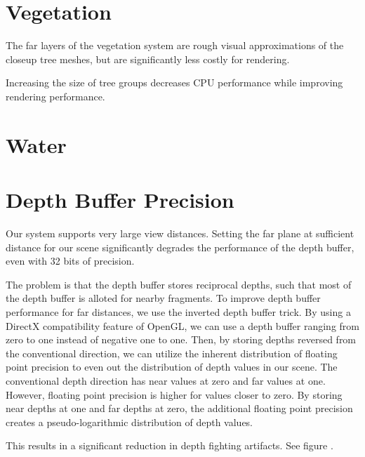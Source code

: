 \section{Vegetation}

The far layers of the vegetation system are rough visual approximations of the closeup tree meshes, but are significantly less costly for rendering.

Increasing the size of tree groups decreases CPU performance while improving rendering performance.


\section{Water}


\section{Depth Buffer Precision}

Our system supports very large view distances.
Setting the far plane at sufficient distance for our scene significantly degrades the performance of the depth buffer, even with 32 bits of precision.

The problem is that the depth buffer stores reciprocal depths, such that most of the depth buffer is alloted for nearby fragments.
To improve depth buffer performance for far distances, we use the inverted depth buffer trick.
By using a DirectX compatibility feature of OpenGL, we can use a depth buffer ranging from zero to one instead of negative one to one.
Then, by storing depths reversed from the conventional direction, we can utilize the inherent distribution of floating point precision to even out the distribution of depth values in our scene.
The conventional depth direction has near values at zero and far values at one.
However, floating point precision is higher for values closer to zero.
By storing near depths at one and far depths at zero, the additional floating point precision creates a pseudo-logarithmic distribution of depth values.

This results in a significant reduction in depth fighting artifacts.
See figure .

